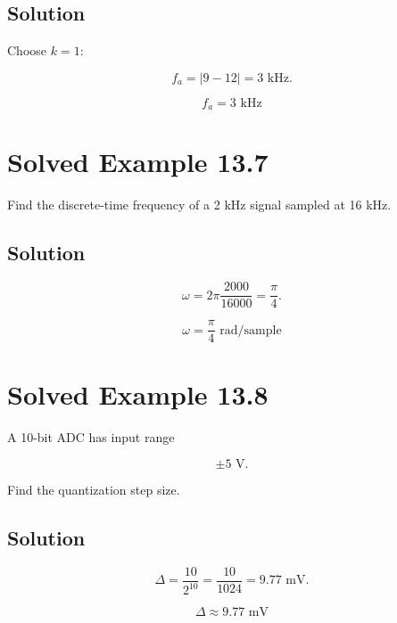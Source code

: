
\subsection{Solution}

Choose \(k=1\):

\[
f_a=|9-12|=3\text{ kHz}.
\]

\[
\boxed{
f_a=3\text{ kHz}
}
\]


\section{Solved Example 13.7}

Find the discrete-time frequency of a 2 kHz signal sampled at 16 kHz.


\subsection{Solution}

\[
\omega=
2\pi\frac{2000}{16000}
=
\frac{\pi}{4}.
\]

\[
\boxed{
\omega=\frac{\pi}{4}\text{ rad/sample}
}
\]


\section{Solved Example 13.8}

A 10-bit ADC has input range

\[
\pm5\text{ V}.
\]

Find the quantization step size.


\subsection{Solution}

\[
\Delta=
\frac{10}{2^{10}}
=
\frac{10}{1024}
=
9.77\text{ mV}.
\]

\[
\boxed{
\Delta\approx9.77\text{ mV}
}
\]

